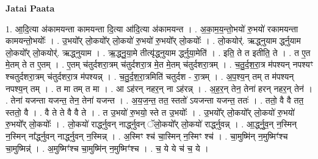 \documentclass[17pt]{extarticle}
\begin{document}
\textbf{Jatai Paata} \newline

1. आ॒दि॒त्या अ॑कामयन्ता कामयन्ता दि॒त्या आ॑दि॒त्या अ॑कामयन्त । . अ॒का॒म॒य॒न्तो॒भयो॑ रु॒भयो॑ रकामयन्ता कामयन्तो॒भयोः᳚ । . उ॒भयो᳚र् लो॒कयो᳚र् लो॒कयो॑ रु॒भयो॑ रु॒भयो᳚र् लो॒कयोः᳚ । . लो॒कयोर्॑. ऋद्ध्नुयाम र्द्ध्नुयाम लो॒कयो᳚र् लो॒कयोर्॑. ऋद्ध्नुयाम । . ऋ॒द्ध्नु॒या॒मे तीत्यृ॑द्ध्नुयाम र्द्ध्नुया॒मेति॑ । . इति॒ ते त इतीति॒ ते । . त ए॒त मे॒तम् ते त ए॒तम् । . ए॒तम् च॑तुर्दशरा॒त्रम् च॑तुर्दशरा॒त्र मे॒त मे॒तम् च॑तुर्दशरा॒त्रम् । . च॒तु॒र्द॒श॒रा॒त्र म॑पश्यन् नपश्यꣳ श्चतुर्दशरा॒त्रम् च॑तुर्दशरा॒त्र म॑पश्यन्न् । . च॒तु॒र्द॒श॒रा॒त्रमिति॑ चतुर्दश - रा॒त्रम् । . अ॒प॒श्य॒न् तम् त म॑पश्यन् नपश्य॒न् तम् । . त मा तम् त मा । . आ ऽह॑रन् नहर॒न् ना ऽह॑रन्न् । . अ॒ह॒र॒न् तेन॒ तेना॑ हरन् नहर॒न् तेन॑ । . तेना॑ यजन्ता यजन्त॒ तेन॒ तेना॑ यजन्त । . अ॒य॒ज॒न्त॒ तत॒ स्ततो॑ ऽयजन्ता यजन्त॒ ततः॑ । . ततो॒ वै वै तत॒ स्ततो॒ वै । . वै ते ते वै वै ते । . त उ॒भयो॑ रु॒भयो॒ स्ते त उ॒भयोः᳚ । . उ॒भयो᳚र् लो॒कयो᳚र् लो॒कयो॑ रु॒भयो॑ रु॒भयो᳚र् लो॒कयोः᳚ । . लो॒कयो॑ रार्द्ध्नुवन् नार्द्ध्नुवन् ॅलो॒कयो᳚र् लो॒कयो॑ रार्द्ध्नुवन्न् । . आ॒र्द्ध्नु॒व॒न् न॒स्मिन् न॒स्मिन् ना᳚र्द्ध्नुवन् नार्द्ध्नुवन् न॒स्मिन्न् । . अ॒स्मिꣳ श्च॑ चा॒स्मिन् न॒स्मिꣳ श्च॑ । . चा॒मुष्मि॑न् न॒मुष्मिꣳ॑श्च चा॒मुष्मिन्न्॑ । . अ॒मुष्मिꣳ॑श्च चा॒मुष्मि॑न् न॒मुष्मिꣳ॑श्च । . च॒ ये ये च॑ च॒ ये । \newline
\end{document}
